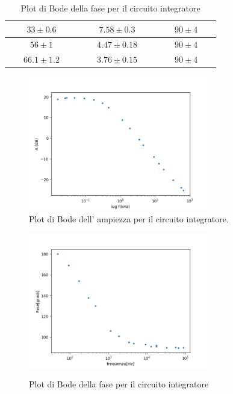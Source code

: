 \documentclass[10pt,a4paper]{article}
\newcommand{\exn}{\phantom{xxx}}
\begin{document}
\begin{table}[h]
\begin{tabular}{|c|c|c|}
				\hline
				$\exn 33\pm 0.6\exn $& $\exn7.58 \pm  0.3
   \exn $ & $\exn90 \pm 4 \exn $ \\
				\hline
				$\exn 56\pm 1 \exn $  & $\exn 4.47\pm0.18   \exn $ & $\exn 90\pm 4\exn $ \\
				
				
				\hline
				$\exn 66.1\pm 1.2\exn $ & $\exn3.76 \pm  0.15 \exn $ & $\exn90 \pm 4\exn $ \\
			
				
				\hline
				
				
				
				
			\end{tabular}


	\begin{figure}[h]
		\begin{center}
			
			\includegraphics[width=0.7\textwidth]{bodeint}
			
	\end{center}
		\caption{\small Plot di Bode dell' ampiezza  per il circuito integratore.}
		\label{fig:bodeinte}
	\end{figure}

         \begin{figure}[h]
                                       
		\begin{center}
			\includegraphics[width=0.7\textwidth]{fase}
			 \label{fig:fase}
		\end{center}
		\caption{\small Plot di Bode della fase per il circuito integratore}
		

\end{figure}
\end{table}
\end{document}
